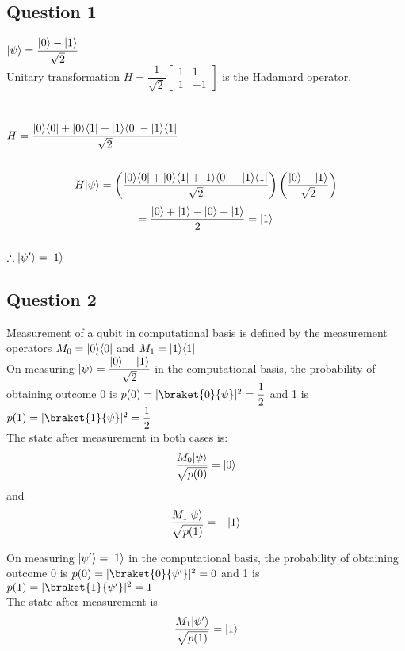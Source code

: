 \documentclass{article}
\DeclarePairedDelimiter\bra{\langle}{\rvert}
\DeclarePairedDelimiter\ket{\lvert}{\rangle}
\begin{document}
\subsection{Question 1}

$\ket{\psi} = \dfrac{\ket{0}-\ket{1}}{\sqrt{2}}$\\

\noindent
Unitary transformation $H = \dfrac{1}{\sqrt{2}} \begin{bmatrix} 1 & 1\\ 1 & -1 \end{bmatrix}$ is the Hadamard operator.\\\\\\
\noindent
$H = \dfrac{\ket{0}\bra{0}+ \ket{0}\bra{1}+\ket{1}\bra{0} - \ket{1}\bra{1}}{\sqrt{2}} $\\\\

\noindent
\[H\ket{\psi} = \left(\dfrac{\ket{0}\bra{0}+ \ket{0}\bra{1}+\ket{1}\bra{0} - \ket{1}\bra{1}}{\sqrt{2}}\right) \left(\dfrac{\ket{0}-\ket{1}}{\sqrt{2}}\right) \]
\[= \dfrac{\ket{0}+\ket{1}-\ket{0}+\ket{1}}{2} = \ket{1}\] \\

\noindent
$\therefore  \ket{\psi^{\prime}} = \ket{1}$

\subsection{Question 2}
Measurement of a qubit in computational basis is defined by the measurement operators $M_0 = \ket{0}\bra{0}$ and $M_1 =\ket{1}\bra{1}$\\

\noindent
On measuring $\ket{\psi} = \dfrac{\ket{0}-\ket{1}}{\sqrt{2}}$ in the computational basis, the probability of obtaining outcome 0 is $p(0)= |\braket{0}{\psi}|^2 = \dfrac{1}{2}$ and 1 is $p(1)= |\braket{1}{\psi}|^2 = \dfrac{1}{2}$\\

\noindent
The state after measurement in both cases is:\\
\[ \dfrac{M_0 \ket{\psi}}{\sqrt{p(0)}} = \ket{0}\] and \[ \dfrac{M_1 \ket{\psi}}{\sqrt{p(1)}} = -\ket{1}\]

\noindent
On measuring $\ket{\psi^{\prime}} = \ket{1}$ in the computational basis, the probability of obtaining outcome 0 is $p(0)= |\braket{0}{\psi^{\prime}}|^2 = 0$ and 1 is $p(1)= |\braket{1}{\psi^{\prime}}|^2 = 1$\\

\noindent
The state after measurement is  \[ \dfrac{M_1 \ket{\psi^{\prime}}}{\sqrt{p(1)}} = \ket{1}\]
\end{document}
